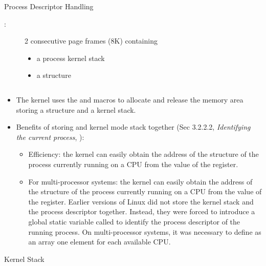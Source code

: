 \begin{frame}{Process Descriptor Handling}
  \begin{description}
  \item[:] 2 consecutive page frames (8K) containing
    \begin{itemize}
    \item a process kernel stack
    \item a  structure
    \end{itemize}
  \end{description}
  \begin{varwidth}{.8\textwidth}
    \inputminted[fontsize=\small]{c}{../figs/thread_union.c}
  \end{varwidth}
\end{frame}

\begin{itemize}
\item The kernel uses the  and  macros
  to allocate and release the memory area storing a  structure and a
  kernel stack.
\item Benefits of storing  and kernel mode stack together (Sec 3.2.2.2,
  \emph{Identifying the current process}, \cite{bovet2005understanding}):
  \begin{itemize}
  \item Efficiency: the kernel can easily obtain the address of the 
    structure of the process currently running on a CPU from the value of the 
    register.
  \item For multi-processor systems: the kernel can easily obtain the address of the
     structure of the process currently running on a CPU from the value
    of the  register. Earlier versions of Linux did not store the kernel stack and the
    process descriptor together. Instead, they were forced to introduce a global static
    variable called  to identify the process descriptor of the running
    process. On multi-processor systems, it was necessary to define  as an
    array one element for each available CPU.
  \end{itemize}
\end{itemize}

\begin{frame}{Kernel Stack}
  \begin{center}
     
  \end{center}
\end{frame}

